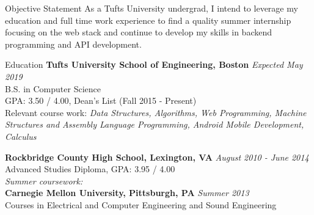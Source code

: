 \documentclass{resume}
\begin{document}
 \begin{rSection}{Objective Statement}
    As a Tufts University undergrad, I intend to leverage my education and full time work experience to find a quality summer internship focusing on the web stack and continue to develop my skills in backend programming and API development.
  \end{rSection}

  \begin{rSection}{Education}
    {\bf Tufts University School of Engineering, Boston} \hfill {\em Expected May 2019} \\ 
    { B.S. in Computer Science} \\
    GPA: 3.50 / 4.00, Dean's List (Fall 2015 - Present)\\
    Relevant course work: \textit{Data Structures, Algorithms, Web Programming, Machine Structures and Assembly Language Programming, Android Mobile Development, Calculus}
    
    {\bf Rockbridge County High School, Lexington, VA} \hfill {\em  August 2010 - June 2014} \\ 
    Advanced Studies Diploma, GPA: 3.95 / 4.00\\
    {\em Summer coursework:}\\
    {\bf Carnegie Mellon University, Pittsburgh, PA} \hfill {\em  Summer 2013} \\ 
    Courses in Electrical and Computer Engineering and Sound Engineering
  \end{rSection}
  
\end{document}
